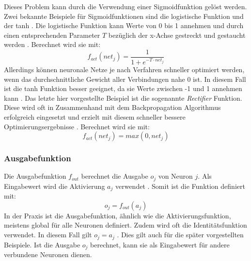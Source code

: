 Dieses Problem kann durch die Verwendung einer Sigmoidfunktion gelöst werden. Zwei bekannte Beispiele für Sigmoidfunktionen sind die logistische Funktion und der \ac{tanh} \cite{lecun2012efficient}. Die logistische Funktion kann Werte von 0 bis 1 annehmen und durch einen entsprechenden Parameter $T$ bezüglich der x-Achse gestreckt und gestaucht werden \cite{kriesel2008kleiner}. Berechnet wird sie mit:
$$f_{act}(net_j)=\frac{1}{1+e^{-T\cdot net_j}}$$
Allerdings können neuronale Netze je nach Verfahren schneller optimiert werden, wenn das durchschnittliche Gewicht aller Verbindungen nahe 0 ist. In diesem Fall ist die \ac{tanh} Funktion besser geeignet, da sie Werte zwischen -1 und 1 annehmen kann  \cite{lecun2012efficient}. Das letzte hier vorgestellte Beispiel ist die sogenannte \emph{Rectifier} Funktion. Diese wird oft in Zusammenhand mit dem Backpropagation Algorithmus erfolgreich eingesetzt und erzielt mit diesem schneller bessere Optimierungsergebnisse \cite{glorot2011deep}. Berechnet wird sie mit:
$$f_{act}(net_j)= max(0, net_j)$$

\subsubsection{Ausgabefunktion}
Die Ausgabefunktion $f_{out}$ berechnet die Ausgabe $o_j$ von Neuron $j$. Als Eingabewert wird die Aktivierung $a_j$ verwendet \cite{zell2003simulation}. Somit ist die Funktion definiert mit:
$$o_j = f_{out}(a_j)$$
In der Praxis ist die Ausgabefunktion, ähnlich wie die Aktivierungsfunktion, meistens global für alle Neuronen definiert. Zudem wird oft die Identitätsfunktion verwendet. In diesem Fall gilt $o_j = a_j$ \cite{kriesel2008kleiner}. Dies gilt auch für die später vorgestellten Beispiele. Ist die Ausgabe $o_j$ berechnet, kann sie als Eingabewert für andere verbundene Neuronen dienen.

